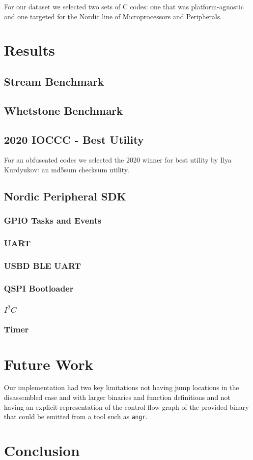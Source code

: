 For our dataset we selected two sets of C codes: one that was platform-agnostic
and one targeted for the Nordic line of Microprocessors and Peripherals. 

\section{Results}

\subsection{Stream Benchmark}
\subsection{Whetstone Benchmark}
\subsection{2020 IOCCC - Best Utility}
For an obfuscated codes we selected the 2020 winner for best utility by Ilya
Kurdyukov: an md5sum checksum utility. 
\subsection{Nordic Peripheral SDK}

\subsubsection{GPIO Tasks and Events}
\subsubsection{UART}
\subsubsection{USBD BLE UART} %
\subsubsection{QSPI Bootloader}
\subsubsection{$I^2C$}
\subsubsection{Timer}



\section{Future Work}

Our implementation had two key limitations not having jump locations in the
disassembled case and with larger binaries and function definitions and not
having an explicit representation of the control flow graph of the provided
binary that could be emitted from a tool such as \verb|angr|. 


\section{Conclusion}
